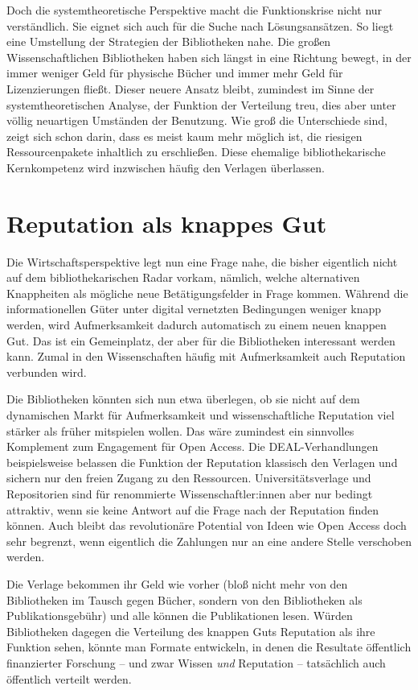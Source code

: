 \documentclass[a4paper,
fontsize=11pt,
oneside,
numbers=noperiodatend,
parskip=half-,
bibliography=totoc,
final
]{scrartcl}
\begin{document}
Doch die systemtheoretische Perspektive macht die Funktionskrise nicht
nur verständlich. Sie eignet sich auch für die Suche nach
Lösungsansätzen. So liegt eine Umstellung der Strategien der
Bibliotheken nahe. Die großen Wissenschaftlichen Bibliotheken haben sich
längst in eine Richtung bewegt, in der immer weniger Geld für physische
Bücher und immer mehr Geld für Lizenzierungen fließt. Dieser neuere
Ansatz bleibt, zumindest im Sinne der systemtheoretischen Analyse, der
Funktion der Verteilung treu, dies aber unter völlig neuartigen
Umständen der Benutzung. Wie groß die Unterschiede sind, zeigt sich
schon darin, dass es meist kaum mehr möglich ist, die riesigen
Ressourcenpakete inhaltlich zu erschließen. Diese ehemalige
bibliothekarische Kernkompetenz wird inzwischen häufig den Verlagen
überlassen.

\hypertarget{reputation-als-knappes-gut}{%
\section{Reputation als knappes
Gut}\label{reputation-als-knappes-gut}}

Die Wirtschaftsperspektive legt nun eine Frage nahe, die bisher
eigentlich nicht auf dem bibliothekarischen Radar vorkam, nämlich,
welche alternativen Knappheiten als mögliche neue Betätigungsfelder in
Frage kommen. Während die informationellen Güter unter digital
vernetzten Bedingungen weniger knapp werden, wird Aufmerksamkeit dadurch
automatisch zu einem neuen knappen Gut. Das ist ein Gemeinplatz, der
aber für die Bibliotheken interessant werden kann. Zumal in den
Wissenschaften häufig mit Aufmerksamkeit auch Reputation verbunden wird.

Die Bibliotheken könnten sich nun etwa überlegen, ob sie nicht auf dem
dynamischen Markt für Aufmerksamkeit und wissenschaftliche Reputation
viel stärker als früher mitspielen wollen. Das wäre zumindest ein
sinnvolles Komplement zum Engagement für Open Access. Die
DEAL-Verhandlungen beispielsweise belassen die Funktion der Reputation
klassisch den Verlagen und sichern nur den freien Zugang zu den
Ressourcen. Universitätsverlage und Repositorien sind für renommierte
Wissenschaftler:innen aber nur bedingt attraktiv, wenn sie keine Antwort
auf die Frage nach der Reputation finden können. Auch bleibt das
revolutionäre Potential von Ideen wie Open Access doch sehr begrenzt,
wenn eigentlich die Zahlungen nur an eine andere Stelle verschoben
werden.

Die Verlage bekommen ihr Geld wie vorher (bloß nicht mehr von den
Bibliotheken im Tausch gegen Bücher, sondern von den Bibliotheken als
Publikationsgebühr) und alle können die Publikationen lesen. Würden
Bibliotheken dagegen die Verteilung des knappen Guts Reputation als ihre
Funktion sehen, könnte man Formate entwickeln, in denen die Resultate
öffentlich finanzierter Forschung -- und zwar Wissen \emph{und}
Reputation -- tatsächlich auch öffentlich verteilt werden.
\end{document}
